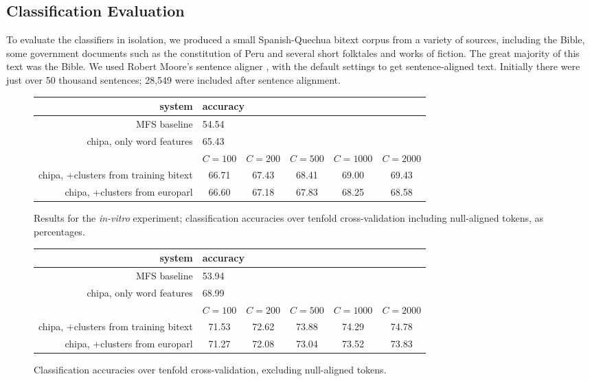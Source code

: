 \documentclass[10pt, a4paper]{article}
\begin{document}
\subsection{Classification Evaluation}
To evaluate the classifiers in isolation, we produced a small Spanish-Quechua
bitext corpus from a variety of sources, including the Bible, some government
documents such as the constitution of Peru and several short folktales and
works of fiction. The great majority of this text was the Bible.
We used Robert Moore's sentence aligner \cite{DBLP:conf/amta/Moore02}, with the
default settings to get sentence-aligned text.
Initially there were just over 50 thousand sentences; 28,549 were included
after sentence alignment.

\begin{figure*}[t!]
  \begin{center}
  \begin{tabular}{|r|c|c|c|c|c|}
    \hline
    system                    & \multicolumn{5}{|l|}{accuracy} \\
    \hline
    MFS baseline              &  \multicolumn{5}{|l|}{54.54} \\
    chipa, only word features &  \multicolumn{5}{|l|}{65.43} \\
    \hline
           & $C=100$ & $C=200$ & $C=500$ & $C=1000$ & $C=2000$ \\
    \hline
    chipa, +clusters from training bitext &
    66.71 & 67.43 & 68.41 & 69.00 & 69.43 \\
    chipa, +clusters from europarl        &
    66.60 & 67.18 & 67.83 & 68.25 & 68.58 \\
    \hline
  \end{tabular}
  \end{center}
\caption{Results for the \emph{in-vitro} experiment; classification accuracies
over tenfold cross-validation including null-aligned tokens, as percentages. }
\label{fig:theresults1}
\end{figure*}

\begin{figure*}[t!]
  \begin{center}
  \begin{tabular}{|r|c|c|c|c|c|}
    \hline
    system                    & \multicolumn{5}{|l|}{accuracy} \\
    \hline
    MFS baseline              &  \multicolumn{5}{|l|}{53.94} \\
    chipa, only word features &  \multicolumn{5}{|l|}{68.99} \\
    \hline
           & $C=100$ & $C=200$ & $C=500$ & $C=1000$ & $C=2000$ \\
    \hline
    chipa, +clusters from training bitext &
    71.53 & 72.62 & 73.88 & 74.29 & 74.78 \\
    chipa, +clusters from europarl        &
    71.27 & 72.08 & 73.04 & 73.52 & 73.83 \\
    \hline
  \end{tabular}
  \end{center}
\caption{Classification accuracies over tenfold cross-validation, excluding
null-aligned tokens.}
\label{fig:theresults2}
\end{figure*}
\end{document}
